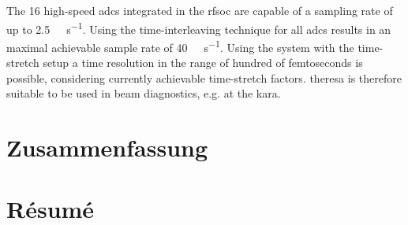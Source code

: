 The 16 high-speed \glspl{adc} integrated in the \gls{rfsoc} are capable of a sampling rate of up to \SI{2.5}{\giga \sample \per \second}.
Using the time-interleaving technique for all \glspl{adc} results in an maximal achievable sample rate of \SI{40}{\giga \sample \per \second}.  %
Using the system with the time-stretch setup a time resolution in the range of hundred of femtoseconds is possible, considering currently achievable time-stretch factors.
\gls{theresa} is therefore suitable to be used in beam diagnostics, e.g. at the \gls{kara}.

\chapter*{Zusammenfassung}
\chapter*{Résumé}